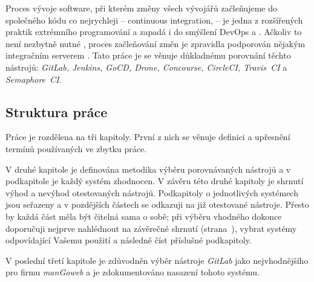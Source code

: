 \label{Úvod}
Proces vývoje software, při kterém změny všech vývojářů začleňujeme do společného kódu co nejrychleji -- continuous integration,  -- je jedna z rozšířených praktik extrémního programování a zapadá i do smýšlení DevOps a  \cite{beyer2016site}. Ačkoliv to není nezbytně nutné \cite{shore-ci}, proces začleňování změn je zpravidla podporován nějakým integračním serverem \cite{fowler-ci}. Tato práce je se věnuje důkladnému porovnání těchto \CICD nástrojů: \textit{GitLab, Jenkins, GoCD, Drone, Concourse, CircleCI, Travis~CI} a \textit{Semaphore~CI}.

\subsection{Struktura práce}
    Práce je rozdělena na tři kapitoly. První z nich se věnuje definici a upřesnění termínů používaných ve zbytku práce.

    V druhé kapitole je definována metodika výběru porovnávaných \CICD nástrojů a v podkapitole je každý systém zhodnocen. V závěru této druhé kapitoly je shrnutí výhod a nevýhod otestovaných nástrojů. Podkapitoly o jednotlivých systémech jsou seřazeny a v pozdějších částech se odkazuji na již otestované nástroje. Přesto by každá část měla být čitelná sama o sobě; při výběru vhodného \CICD dokonce doporučuji nejprve nahlédnout na závěrečné shrnutí (strana~\pageref{overview}), vybrat systémy odpovídající Vašemu použití a následně číst příslušné podkapitoly.

    V poslední třetí kapitole je zdůvodněn výběr nástroje \textit{GitLab} jako nejvhodnějšího pro firmu \textit{manGoweb} a je zdokumentováno nasazení tohoto systému.
